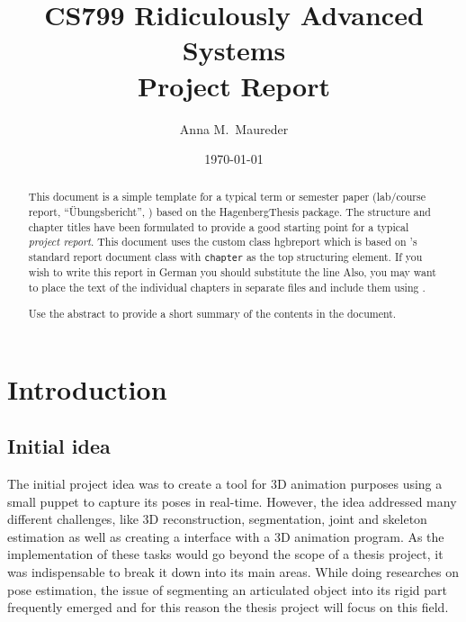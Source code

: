 \documentclass[notitlepage,english]{hgbreport}
\author{Anna M.\ Maureder}
\title{CS799 Ridiculously Advanced Systems\\ %
			Project Report}	%
\date{\today}
\begin{document}

\maketitle

\begin{abstract}\noindent
This document is a simple template for a typical term or semester paper (lab/course report, 
``Übungsbericht'', \etc) based on the \textsf{HagenbergThesis} \latex package.
The structure and chapter titles have been formulated to provide a good starting point
for a typical \emph{project report}.
This document uses the custom class \textsf{hgbreport} which is based on \latex's standard \textsf{report} 
document class with \texttt{chapter} as the top structuring element. 
If you wish to write this report in German you should substitute the line
Also, you may want to place the text of the individual chapters in separate files and 
include them using \verb!!.

\bigskip
\noindent
Use the abstract to provide a short summary of the contents in the document.
\end{abstract}


\tableofcontents



\chapter {Introduction}

\section{Initial idea}

The initial project idea was to create a tool for 3D animation purposes using a small puppet to capture its poses in real-time. However, the idea addressed many different challenges, like 3D reconstruction, segmentation, joint and skeleton estimation as well as creating a interface with a 3D animation program. As the implementation of these tasks would go beyond the scope of a thesis project, it was indispensable to break it down into its main areas. While doing researches on pose estimation, the issue of segmenting an articulated object into its rigid part frequently emerged and for this reason the thesis project will focus on this field.
\end{document}
